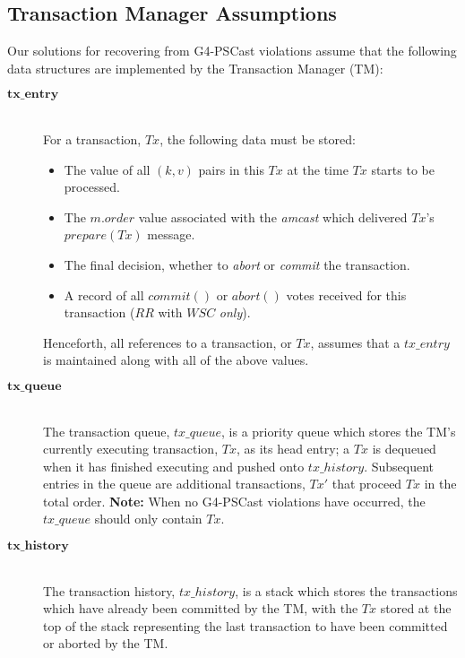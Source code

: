     \subsection{Transaction Manager Assumptions}
    Our solutions for recovering from G4-PSCast violations assume that the following data structures are implemented by the Transaction Manager (TM):
    
    \begin{description}
        \item[$\bm{tx\_entry}$] \hfill \\
        For a transaction, $Tx$, the following data must be stored:
            \begin{itemize}
                \item    The value of all $(k,v)$ pairs in this $Tx$ at the time $Tx$ starts to be processed.
                \item    The $m.order$ value associated with the \emph{amcast} which delivered $Tx$'s $prepare(Tx)$ message.  
                \item    The final decision, whether to \emph{abort} or \emph{commit} the transaction.
                
                \item    A record of all $commit()$ or $abort()$ votes received for this transaction ($RR$ with $WSC$ \emph{only}).  
            \end{itemize}
            
        Henceforth, all references to a transaction, or $Tx$, assumes that a $tx\_entry$ is maintained along with all of the above values.  
            
        \item[$\bm{tx\_queue}$] \hfill \\
        The transaction queue, $tx\_queue$, is a priority queue which stores the TM's currently executing transaction, $Tx$, as its head entry; a $Tx$ is dequeued when it has finished executing and pushed onto $tx\_history$.  Subsequent entries in the queue are additional transactions, $Tx'$ that proceed $Tx$ in the total order.  \textbf{Note:} When no G4-PSCast violations have occurred, the $tx\_queue$ should only contain $Tx$.  
        
        \item[$\bm{tx\_history}$] \hfill \\
        The transaction history, $tx\_history$, is a stack which stores the transactions which have already been committed by the TM, with the $Tx$ stored at the top of the stack representing the last transaction to have been committed or aborted by the TM.  
    \end{description}
    
